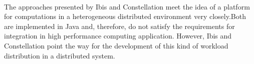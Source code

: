 \paragraph*{}
The approaches presented by Ibis and Constellation meet the idea of a
platform for computations in a heterogeneous distributed environment
very closely.Both are implemented in Java and, therefore, do not
satisfy the requirements for integration in high performance computing
application. However, Ibis and Constellation point the way for the
development of this kind of workload distribution in a distributed
system.


\cleardoublepage

